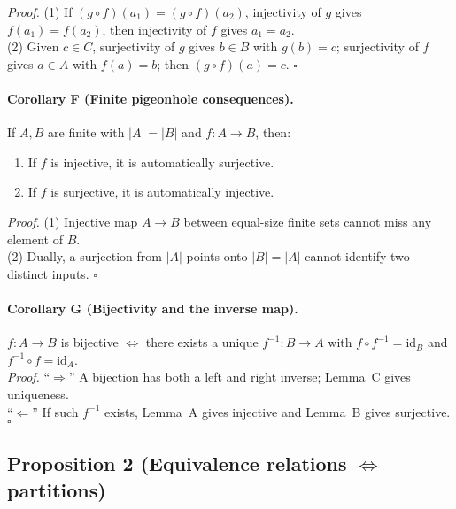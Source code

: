 \documentclass[12pt]{article}
\theoremstyle{definition}
\begin{document}
\emph{Proof.} (1) If \((g\circ f)(a_1)=(g\circ f)(a_2)\), injectivity of \(g\) gives \(f(a_1)=f(a_2)\), then injectivity of \(f\) gives \(a_1=a_2\).\\

\noindent
(2) Given \(c\in C\), surjectivity of \(g\) gives \(b\in B\) with \(g(b)=c\); surjectivity of \(f\) gives \(a\in A\) with \(f(a)=b\); then \((g\circ f)(a)=c\). \(\square\)

\dotfill

\paragraph{\textbf{Corollary F (Finite pigeonhole consequences).}}

If \(A,B\) are finite with \(|A|=|B|\) and \(f:A\to B\), then:
\begin{enumerate}
    \item If \(f\) is injective, it is automatically surjective.
    \item If \(f\) is surjective, it is automatically injective.
\end{enumerate}

\emph{Proof.} (1) Injective map \(A\to B\) between equal-size finite sets cannot miss any element of \(B\).\\

\noindent
(2) Dually, a surjection from \(|A|\) points onto \(|B|=|A|\) cannot identify two distinct inputs. \(\square\)

\dotfill

\paragraph{\textbf{Corollary G (Bijectivity and the inverse map).}}

\(f:A\to B\) is bijective \(\iff\) there exists a unique \(f^{-1}:B\to A\) with \(f\circ f^{-1}=\mathrm{id}_B\) and \(f^{-1}\circ f=\mathrm{id}_A\).\\

\emph{Proof.} ``\(\Rightarrow\)'' A bijection has both a left and right inverse; Lemma~C gives uniqueness.\\

\noindent
``\(\Leftarrow\)'' If such \(f^{-1}\) exists, Lemma~A gives injective and Lemma~B gives surjective. \(\square\)


\newpage

\subsection*{Proposition 2 (Equivalence relations \(\Longleftrightarrow\) partitions)}
\end{document}
